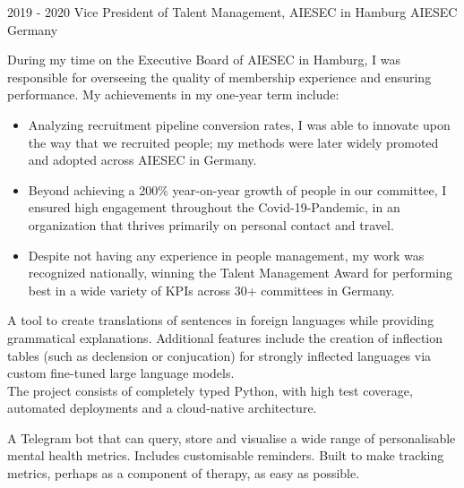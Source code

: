 \documentclass[9pt]{developercv} %
\begin{document}
\begin{entrylist}
	\entry
		{2019 - 2020}
		{Vice President of Talent Management, AIESEC in Hamburg}
		{AIESEC Germany}
		{During my time on the Executive Board of AIESEC in Hamburg, I was responsible for overseeing the quality of membership experience and ensuring performance. My achievements in my one-year term include:

        \begin{itemize}
            \item Analyzing recruitment pipeline conversion rates, I was able to innovate upon the way that we recruited people; my methods were later widely promoted and adopted across AIESEC in Germany.
            \item   Beyond achieving a 200\% year-on-year growth of people in our committee, I ensured high engagement throughout the Covid-19-Pandemic, in an organization that thrives primarily on personal contact and travel.
            \item     Despite not having any experience in people management, my work was recognized nationally, winning the Talent Management Award for performing best in a wide variety of KPIs across 30+ committees in Germany.
        \end{itemize}  
        }
\end{entrylist}




\begin{entrylist}
	\project
		{}
		{
        A tool to create translations of sentences in foreign languages while providing grammatical explanations. Additional features include the creation of inflection tables (such as declension or conjucation) for strongly inflected languages via custom fine-tuned large language models. \\

        The project consists of completely typed Python, with high test coverage, automated deployments and a cloud-native architecture.\\
        }
 
    \project
        {}
        {
        A Telegram bot that can query, store and visualise a wide range of personalisable mental health metrics. Includes customisable reminders. Built to make tracking metrics, perhaps as a component of therapy, as easy as possible.
        }
\end{entrylist}
\end{document}
